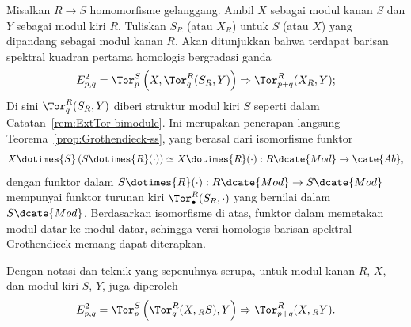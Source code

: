 \begin{example}\label{eg:change-of-rings-SS}
	Misalkan $R\to S$ homomorfisme gelanggang. Ambil $X$ sebagai modul kanan
	$S$ dan $Y$ sebagai modul kiri $R$. Tuliskan $S_R$ (atau $X_R$) untuk $S$
	(atau $X$) yang dipandang sebagai modul kanan $R$. Akan ditunjukkan bahwa
	terdapat barisan spektral kuadran pertama homologis bergradasi ganda
	\begin{gather*}
		E^2_{p,q} = \Tor^S_p\left( X, \Tor^R_q(S_R, Y) \right) \Rightarrow \Tor^R_{p+q}(X_R, Y);
	\end{gather*}
	Di sini $\Tor^R_q(S_R,Y)$ diberi struktur modul kiri $S$ seperti dalam
	Catatan~\ref{rem:ExtTor-bimodule}. Ini merupakan penerapan langsung
	Teorema~\ref{prop:Grothendieck-ss}, yang berasal dari isomorfisme funktor
	\[ X \dotimes{S} \left( S \dotimes{R} (\cdot) \right) \simeq X \dotimes{R} (\cdot) : R\dcate{Mod} \to \cate{Ab}, \]
	dengan funktor dalam
	$S\dotimes{R}(\cdot):R\dcate{Mod}\to S\dcate{Mod}$ mempunyai funktor
	turunan kiri $\Tor^R_\bullet(S_R,\cdot)$ yang bernilai dalam
	$S\dcate{Mod}$. Berdasarkan isomorfisme di atas, funktor dalam memetakan
	modul datar ke modul datar, sehingga versi homologis barisan spektral
	Grothendieck memang dapat diterapkan.

	Dengan notasi dan teknik yang sepenuhnya serupa, untuk modul kanan $R$, $X$,
	dan modul kiri $S$, $Y$, juga diperoleh
	\[ E^2_{p,q} = \Tor^S_p\left( \Tor^R_q(X, {}_R S), Y \right) \Rightarrow \Tor^R_{p+q}(X, {}_R Y). \]


\end{example}
